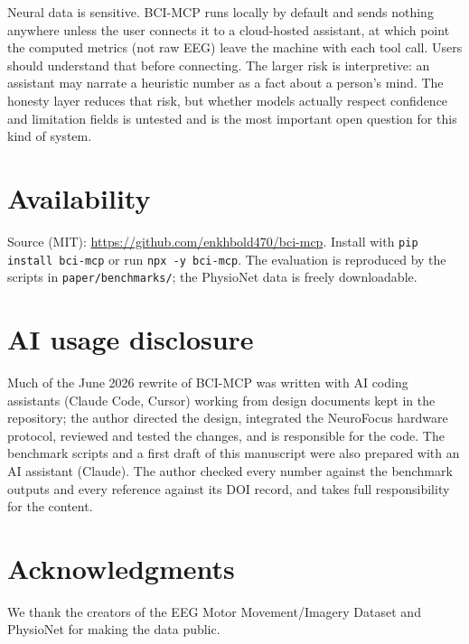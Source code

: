 \documentclass[10pt,twocolumn,letterpaper]{article}
\begin{document}
Neural data is sensitive. BCI-MCP runs locally by default and sends nothing
anywhere unless the user connects it to a cloud-hosted assistant, at which point
the computed metrics (not raw EEG) leave the machine with each tool call. Users
should understand that before connecting. The larger risk is interpretive: an
assistant may narrate a heuristic number as a fact about a person's mind. The
honesty layer reduces that risk, but whether models actually respect confidence
and limitation fields is untested and is the most important open question for
this kind of system.

\section{Availability}
Source (MIT): \url{https://github.com/enkhbold470/bci-mcp}. Install with
\texttt{pip install bci-mcp} or run \texttt{npx -y bci-mcp}. The evaluation is
reproduced by the scripts in \texttt{paper/benchmarks/}; the PhysioNet data is
freely downloadable.

\section*{AI usage disclosure}
Much of the June 2026 rewrite of BCI-MCP was written with AI coding assistants
(Claude Code, Cursor) working from design documents kept in the repository; the
author directed the design, integrated the NeuroFocus hardware protocol, reviewed
and tested the changes, and is responsible for the code. The benchmark scripts
and a first draft of this manuscript were also prepared with an AI assistant
(Claude). The author checked every number against the benchmark outputs and every
reference against its DOI record, and takes full responsibility for the content.

\section*{Acknowledgments}
We thank the creators of the EEG Motor Movement/Imagery Dataset and PhysioNet for
making the data public.

\small


\end{document}

